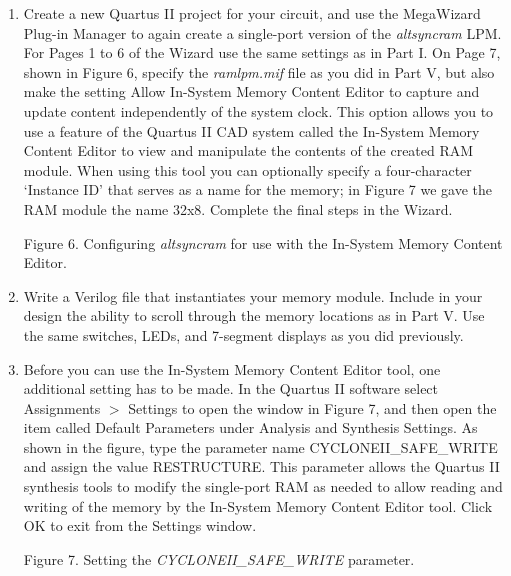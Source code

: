 \documentclass[psfig,10pt,fullpage]{article}
\begin{document}
\begin{enumerate}
\item Create a new Quartus II project for your circuit, and use the
MegaWizard Plug-in Manager to again create a single-port version of the {\it altsyncram}
LPM. For Pages 1 to 6 of the Wizard use the same settings as in Part I. On Page 7, shown
in Figure 6, specify the {\it ramlpm.mif} file as you did in Part V, but also make the
setting {\sf Allow In-System Memory Content Editor to capture and 
update content independently of the
system clock}. This option allows you to use a feature of the Quartus II CAD system called the 
In-System Memory Content Editor to view and manipulate the contents of the created RAM
module. When using this tool you can optionally specify a four-character {\sf `Instance
ID'} that serves as a name for the memory; in Figure 7 we gave the RAM module the
name {\sf 32x8}. Complete the final steps in the Wizard.

\begin{figure}[H]
\scriptsize
\centerline{
\hbox{}}
\end{figure}
\centerline{Figure 6.  Configuring {\it altsyncram} for use with the In-System Memory Content Editor.}

\item Write a Verilog file that instantiates your memory module. Include in your design
the ability to scroll through the memory locations as in Part V. Use the same switches,
LEDs, and 7-segment displays as you did previously.

\item Before you can use the In-System Memory Content Editor tool, one additional setting
has to be made. In the 
Quartus II software select {\sf Assignments $>$ Settings} to open the window in Figure
7, and then open the item called
{\sf Default Parameters} under {\sf Analysis and Synthesis
Settings}. As shown in the figure, type the parameter name {\sf CYCLONEII\_SAFE\_WRITE} and
assign the value {\sf RESTRUCTURE}. This parameter allows the Quartus II synthesis tools
to modify the single-port RAM as needed to allow reading and writing of the memory by the 
In-System Memory Content Editor tool. Click {\sf OK} to exit from the Settings window.

\begin{figure}[H]
\scriptsize
\centerline{
\hbox{}}
\end{figure}
\centerline{Figure 7.  Setting the {\it CYCLONEII\_SAFE\_WRITE} parameter.}


\end{enumerate}
\end{document}
